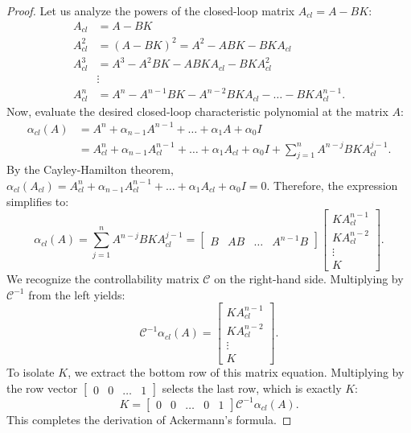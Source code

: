 \begin{proof}
Let us analyze the powers of the closed-loop matrix $A_{cl} = A - BK$:
\begin{align}
    A_{cl} &= A - BK \nonumber \\
    A_{cl}^2 &= (A - BK)^2 = A^2 - ABK - BKA_{cl} \nonumber \\
    A_{cl}^3 &= A^3 - A^2BK - ABKA_{cl} - BKA_{cl}^2 \nonumber \\
    &\vdots \nonumber \\
A_{cl}^n &= A^n - A^{n-1}BK - A^{n-2}BKA_{cl} - \dots - BKA_{cl}^{n-1} .
\end{align}
Now, evaluate the desired closed-loop characteristic polynomial at the matrix $A$:
\begin{align}
    \alpha_{cl}(A) &= A^n + \alpha_{n-1} A^{n-1} + \dots + \alpha_1 A + \alpha_0 I \nonumber \\
&= A_{cl}^n + \alpha_{n-1} A_{cl}^{n-1} + \dots + \alpha_1 A_{cl} + \alpha_0 I + \sum_{j=1}^n A^{n-j} B K A_{cl}^{j-1} .
\end{align}
By the Cayley-Hamilton theorem, $\alpha_{cl}(A_{cl}) = A_{cl}^n + \alpha_{n-1} A_{cl}^{n-1} + \dots + \alpha_1 A_{cl} + \alpha_0 I = 0$. Therefore, the expression simplifies to:
\begin{equation}
\alpha_{cl}(A) = \sum_{j=1}^n A^{n-j} B K A_{cl}^{j-1} = \begin{bmatrix} B & AB & \dots & A^{n-1}B \end{bmatrix} \begin{bmatrix} K A_{cl}^{n-1} \\ K A_{cl}^{n-2} \\ \vdots \\ K \end{bmatrix} .
\end{equation}
We recognize the controllability matrix $\mathcal{C}$ on the right-hand side. Multiplying by $\mathcal{C}^{-1}$ from the left yields:
\begin{equation}
\mathcal{C}^{-1} \alpha_{cl}(A) = \begin{bmatrix} K A_{cl}^{n-1} \\ K A_{cl}^{n-2} \\ \vdots \\ K \end{bmatrix} .
\end{equation}
To isolate $K$, we extract the bottom row of this matrix equation. Multiplying by the row vector $\begin{bmatrix} 0 & 0 & \dots & 1 \end{bmatrix}$ selects the last row, which is exactly $K$:
\begin{equation}
K = \begin{bmatrix} 0 & 0 & \dots & 0 & 1 \end{bmatrix} \mathcal{C}^{-1} \alpha_{cl}(A) .
\end{equation}
This completes the derivation of Ackermann's formula.
\end{proof}

